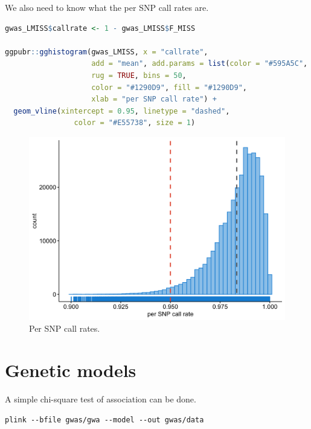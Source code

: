 \documentclass[
]{book}
\begin{document}
We also need to know what the per SNP call rates are.

\begin{lstlisting}[language=R]
gwas_LMISS$callrate <- 1 - gwas_LMISS$F_MISS

ggpubr::gghistogram(gwas_LMISS, x = "callrate",
                    add = "mean", add.params = list(color = "#595A5C", linetype = "dashed", size = 1),
                    rug = TRUE, bins = 50,
                    color = "#1290D9", fill = "#1290D9",
                    xlab = "per SNP call rate") +
  geom_vline(xintercept = 0.95, linetype = "dashed",
                color = "#E55738", size = 1)
\end{lstlisting}

\begin{figure}

{\centering \includegraphics[width=18.67in]{img/_gwas/show-snp-callrate-gwas} 

}

\caption{Per SNP call rates.}\label{fig:show-snp-callrate-gwas}
\end{figure}

\hypertarget{genetic-models}{%
\section{Genetic models}\label{genetic-models}}

A simple chi-square test of association can be done.

\begin{lstlisting}
plink --bfile gwas/gwa --model --out gwas/data
\end{lstlisting}
\end{document}
